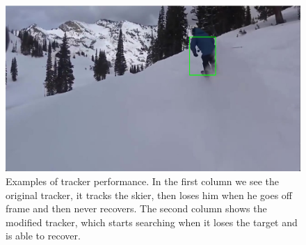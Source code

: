 \documentclass[9pt]{IEEEtran}
\begin{document}
\begin{figure}[H]
    \includegraphics[width=0.48\columnwidth]{../figs/2_frame_372.png} %
    \caption{Examples of tracker performance. In the first column we see the original tracker, it tracks the skier, then loses him when he goes off frame and then never recovers. The second column shows the modified tracker, which starts searching when it loses the target and is able to recover.}
    \label{fig:grid_3x2} %
\end{figure}
\end{document}
